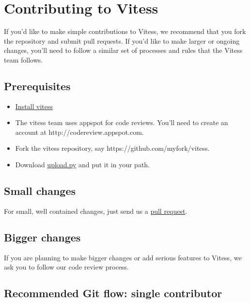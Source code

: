 \section{Contributing to Vitess}\hypertarget{contributing-to-vitess}{}\label{contributing-to-vitess}

If you'd like to make simple contributions to Vitess, we recommend that you fork
the repository and submit pull requests. If you'd like to make larger or ongoing
changes, you'll need to follow a similar set of processes and rules that the
Vitess team follows.

\subsection{Prerequisites}\hypertarget{prerequisites}{}\label{prerequisites}

\begin{itemize}
\item \href{https://github.com/youtube/vitess/blob/master/doc/GettingStarted.markdown}{Install vitess}
\item The vitess team uses appspot for code reviews. You'll need to create an account at http://codereview.appspot.com.
\item Fork the vitess repository, say https://github.com/myfork/vitess.
\item Download \href{https://code.google.com/p/rietveld/wiki/UploadPyUsage}{upload.py} and put it in your path.
\end{itemize}

\subsection{Small changes}\hypertarget{small-changes}{}\label{small-changes}

For small, well contained changes, just send us a
\href{https://help.github.com/articles/using-pull-requests}{pull request}.

\subsection{Bigger changes}\hypertarget{bigger-changes}{}\label{bigger-changes}

If you are planning to make bigger changes or add serious features to Vitess, we
ask you to follow our code review process.

\subsection{Recommended Git flow: single contributor}\hypertarget{recommended-git-flow-single-contributor}{}\label{recommended-git-flow-single-contributor}

